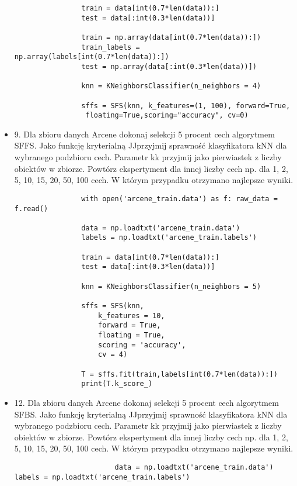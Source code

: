 \documentclass[12pt,a4paper]{article}
\begin{document}
\begin{itemize}
\begin{lstlisting}
                train = data[int(0.7*len(data)):]
                test = data[:int(0.3*len(data))]
                 
                train = np.array(data[int(0.7*len(data)):])
                train_labels = np.array(labels[int(0.7*len(data)):])
                test = np.array(data[:int(0.3*len(data))])
                 
                knn = KNeighborsClassifier(n_neighbors = 4)
                
                sffs = SFS(knn, k_features=(1, 100), forward=True,
                 floating=True,scoring="accuracy", cv=0) 

	\end{lstlisting}
                \clearpage
                \item 9. Dla zbioru danych Arcene dokonaj selekcji 5 procent cech algorytmem SFFS. Jako funkcję kryterialną JJprzyjmij sprawność klasyfikatora kNN dla wybranego podzbioru cech. Parametr kk przyjmij jako pierwiastek z liczby obiektów w zbiorze. Powtórz ekspertyment dla innej liczby cech np. dla 1, 2, 5, 10, 15, 20, 50, 100 cech. W którym przypadku otrzymano najlepsze wyniki.
	\begin{lstlisting}
                with open('arcene_train.data') as f: raw_data = f.read()
 
                data = np.loadtxt('arcene_train.data')
                labels = np.loadtxt('arcene_train.labels')
                 
                train = data[int(0.7*len(data)):]
                test = data[:int(0.3*len(data))]
                 
                knn = KNeighborsClassifier(n_neighbors = 5)
                 
                sffs = SFS(knn,
                    k_features = 10,
                    forward = True,
                    floating = True,
                    scoring = 'accuracy',
                    cv = 4)
                   
                T = sffs.fit(train,labels[int(0.7*len(data)):])
                print(T.k_score_)
	\end{lstlisting}
		
                \clearpage

                \item 12. Dla zbioru danych Arcene dokonaj selekcji 5 procent cech algorytmem SFBS. Jako funkcję kryterialną JJprzyjmij sprawność klasyfikatora kNN dla wybranego podzbioru cech. Parametr kk przyjmij jako pierwiastek z liczby obiektów w zbiorze. Powtórz ekspertyment dla innej liczby cech np. dla 1, 2, 5, 10, 15, 20, 50, 100 cech. W którym przypadku otrzymano najlepsze wyniki.
                \begin{lstlisting}
                        data = np.loadtxt('arcene_train.data')
labels = np.loadtxt('arcene_train.labels')
 

\end{lstlisting}
\end{itemize}
\end{document}
